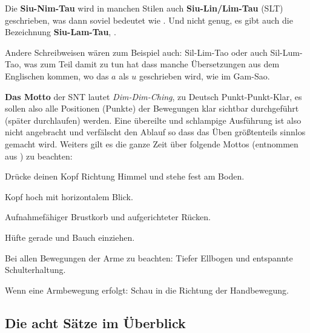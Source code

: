 \begin{WTCommonBegriff}
	Die \textbf{Siu-Nim-Tau} wird in manchen Stilen auch \textbf{Siu-Lin/Lim-Tau} (SLT) geschrieben, was dann soviel bedeutet wie . Und nicht genug, es gibt auch die Bezeichnung \textbf{Siu-Lam-Tau}, .
	
	Andere Schreibweisen w\"aren zum Beispiel auch: Sil-Lim-Tao oder auch Sil-Lum-Tao, was zum Teil damit zu tun hat dass manche \"Ubersetzungen aus dem Englischen kommen, wo das $a$ als $u$ geschrieben wird, wie im Gam-Sao.
\end{WTCommonBegriff}



\textbf{Das Motto} der SNT lautet \textit{Dim-Dim-Ching}, zu Deutsch {Punkt-Punkt-Klar}, es sollen also alle Positionen (Punkte) der Bewegungen klar sichtbar durchgef\"uhrt (sp\"ater durchlaufen) werden. Eine \"ubereilte und schlampige Ausf\"uhrung ist also nicht angebracht und verf\"alscht den Ablauf so dass das \"Uben gr\"o{\ss}tenteils sinnlos gemacht wird. Weiters gilt es die ganze Zeit \"uber folgende Mottos (entnommen aus \cite{WTBIBLeu11}) zu beachten:

\begin{itemizeNarrow}
	\item Dr\"ucke deinen Kopf Richtung Himmel und stehe fest am Boden.
	\item Kopf hoch mit horizontalem Blick.
	\item Aufnahmef\"ahiger Brustkorb und aufgerichteter R\"ucken.
	\item H\"ufte gerade und Bauch einziehen.
	\item Bei allen Bewegungen der Arme zu beachten: Tiefer Ellbogen und entspannte Schulterhaltung.
	\item Wenn eine Armbewegung erfolgt: Schau in die Richtung der Handbewegung.
\end{itemizeNarrow}

\subsection*{Die acht S\"atze im \"Uberblick}


